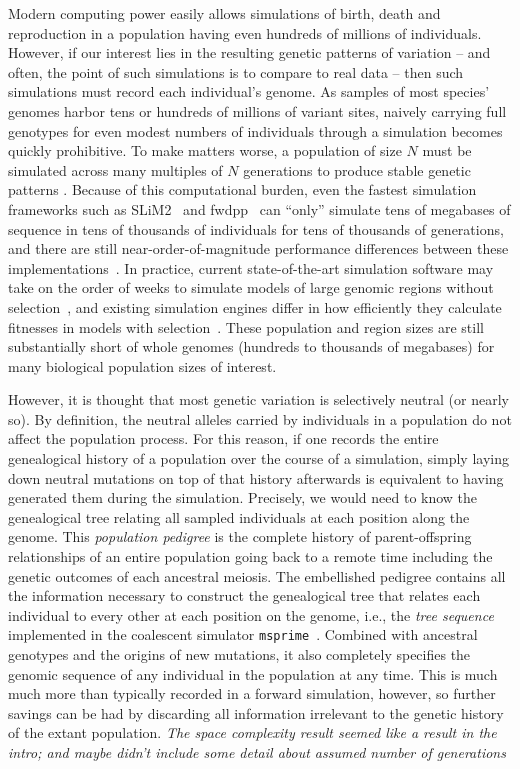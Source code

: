 \documentclass{article}
\newcommand{\msprime}{\texttt{msprime}}
\newcommand{\jda}[1]{{\em \color{cyan} #1}}
\begin{document}
Modern computing power easily allows simulations of birth, death and reproduction
in a population having even hundreds of millions of individuals.
However, if our interest lies in the resulting genetic patterns of variation
-- and often, the point of such simulations is to compare to real data --
then such simulations must record each individual's genome.
As samples of most species' genomes harbor tens or hundreds of millions of variant sites,
naively carrying full genotypes for even modest numbers of individuals through a simulation
becomes quickly prohibitive.
To make matters worse,
a population of size $N$ must be simulated across many multiples of $N$ generations
to produce stable genetic patterns \citep{wright1931evolution, wakeley2005coalescent}.
Because of this computational burden, even the fastest simulation frameworks such as
SLiM2~\citep{haller2017flexible} and fwdpp~\citep{fwdpp}
can ``only'' simulate tens of megabases of sequence in tens of thousands of individuals
for tens of thousands of generations, and there are still near-order-of-magnitude performance differences between these
implementations~\citep{haller2017flexible}.
In practice, current state-of-the-art simulation software may take on the order of
weeks to simulate models of large genomic regions without selection~\citep{fwdpp,Hernandez2015-wf},
and existing simulation engines differ in how efficiently they
calculate fitnesses in models with selection~\citep{fwdpp}.
These population and region sizes are still substantially short of whole genomes
(hundreds to thousands of megabases)
for many biological population sizes of interest.

However, it is thought that most genetic variation is selectively neutral (or nearly so).
By definition, the neutral alleles carried by individuals in a population
do not affect the population process.
For this reason, if one records the entire genealogical history of a population over the course of a simulation,
simply laying down neutral mutations on top of that history afterwards
is equivalent to having generated them during the simulation.
Precisely, we would need to know the genealogical tree relating all sampled individuals
at each position along the genome.
This \emph{population pedigree} is 
the complete history of parent-offspring relationships of an entire population
going back to a remote time including the genetic outcomes of each ancestral
meiosis.
The embellished pedigree contains all the information necessary
to construct the genealogical tree that relates each individual to every other
at each position on the genome,
i.e., the \emph{tree sequence} implemented in the coalescent simulator \msprime{}~\citep{kelleher2016efficient}.
Combined with ancestral genotypes and the origins of new mutations,
it also completely specifies the genomic sequence of any individual in the population at any time.
This is much much more than typically recorded in a forward simulation, however,
so further savings can be had by discarding all information irrelevant to the genetic history
of the extant population.
\jda{The space complexity result seemed like a result in the intro; and maybe didn't include some detail
	about assumed number of generations}
\end{document}

